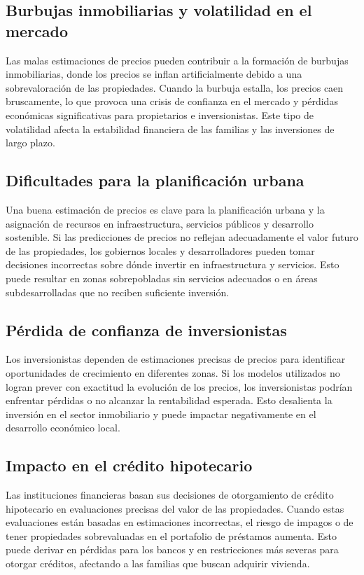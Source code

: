 \subsection*{Burbujas inmobiliarias y volatilidad en el mercado}
Las malas estimaciones de precios pueden contribuir a la formación de burbujas inmobiliarias, donde los precios se inflan artificialmente debido a una sobrevaloración de las propiedades. Cuando la burbuja estalla, los precios caen bruscamente, lo que provoca una crisis de confianza en el mercado y pérdidas económicas significativas para propietarios e inversionistas. Este tipo de volatilidad afecta la estabilidad financiera de las familias y las inversiones de largo plazo.

\subsection*{Dificultades para la planificación urbana}
Una buena estimación de precios es clave para la planificación urbana y la asignación de recursos en infraestructura, servicios públicos y desarrollo sostenible. Si las predicciones de precios no reflejan adecuadamente el valor futuro de las propiedades, los gobiernos locales y desarrolladores pueden tomar decisiones incorrectas sobre dónde invertir en infraestructura y servicios. Esto puede resultar en zonas sobrepobladas sin servicios adecuados o en áreas subdesarrolladas que no reciben suficiente inversión.

\subsection*{Pérdida de confianza de inversionistas}
Los inversionistas dependen de estimaciones precisas de precios para identificar oportunidades de crecimiento en diferentes zonas. Si los modelos utilizados no logran prever con exactitud la evolución de los precios, los inversionistas podrían enfrentar pérdidas o no alcanzar la rentabilidad esperada. Esto desalienta la inversión en el sector inmobiliario y puede impactar negativamente en el desarrollo económico local.

\subsection*{Impacto en el crédito hipotecario}
Las instituciones financieras basan sus decisiones de otorgamiento de crédito hipotecario en evaluaciones precisas del valor de las propiedades. Cuando estas evaluaciones están basadas en estimaciones incorrectas, el riesgo de impagos o de tener propiedades sobrevaluadas en el portafolio de préstamos aumenta. Esto puede derivar en pérdidas para los bancos y en restricciones más severas para otorgar créditos, afectando a las familias que buscan adquirir vivienda.

